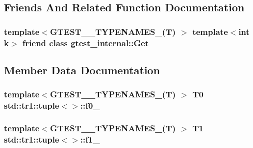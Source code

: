 \subsection{Friends And Related Function Documentation}
\hypertarget{classstd_1_1tr1_1_1tuple_aeeed38755abdaa78587dd1eac9ccc950}{}
\subsubsection[{gtest\+\_\+internal\+::\+Get}]{\setlength{\rightskip}{0pt plus 5cm}template$<$G\+T\+E\+S\+T\+\_\+\_\+\+T\+Y\+P\+E\+N\+A\+M\+E\+S\+\_\+(\+T) $>$ template$<$int k$>$ friend class {\bf gtest\+\_\+internal\+::\+Get}\hspace{0.3cm}{\ttfamily [friend]}}\label{classstd_1_1tr1_1_1tuple_aeeed38755abdaa78587dd1eac9ccc950}


\subsection{Member Data Documentation}
\hypertarget{classstd_1_1tr1_1_1tuple_a771b1d99e8800fb284acd04bca838cbb}{}
\subsubsection[{f0\+\_\+}]{\setlength{\rightskip}{0pt plus 5cm}template$<$G\+T\+E\+S\+T\+\_\+\_\+\+T\+Y\+P\+E\+N\+A\+M\+E\+S\+\_\+(\+T) $>$ T0 {\bf std\+::tr1\+::tuple}$<$$>$\+::f0\+\_\+}\label{classstd_1_1tr1_1_1tuple_a771b1d99e8800fb284acd04bca838cbb}
\hypertarget{classstd_1_1tr1_1_1tuple_a7cccf899dedc626c51fa4f6921d0ac52}{}
\subsubsection[{f1\+\_\+}]{\setlength{\rightskip}{0pt plus 5cm}template$<$G\+T\+E\+S\+T\+\_\+\_\+\+T\+Y\+P\+E\+N\+A\+M\+E\+S\+\_\+(\+T) $>$ T1 {\bf std\+::tr1\+::tuple}$<$$>$\+::f1\+\_\+}\label{classstd_1_1tr1_1_1tuple_a7cccf899dedc626c51fa4f6921d0ac52}
\hypertarget{classstd_1_1tr1_1_1tuple_aaec06c27366502dc332ef96878628f84}{}
